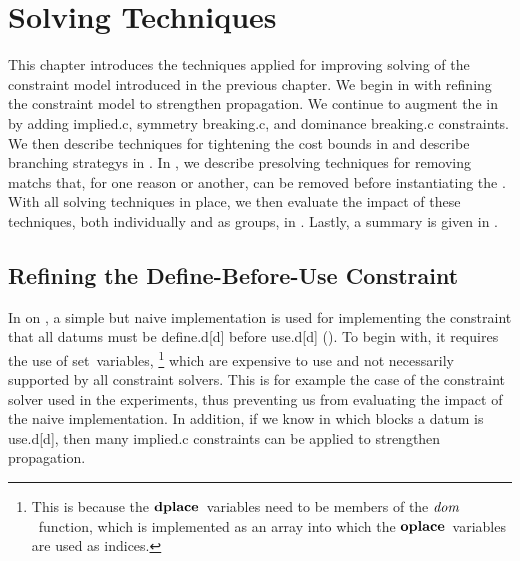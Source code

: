 %

\chapter{Solving Techniques}

This chapter introduces the techniques applied for improving solving of the
\gls{constraint model} introduced in the previous chapter.
%
We begin in  with refining the \gls{constraint model} to
strengthen \gls{propagation}.
%
We continue to augment the  in
 by adding
\gls{implied.c}, \gls{symmetry breaking.c}, and \gls{dominance breaking.c}
\glspl{constraint}.
%
We then describe techniques for tightening the cost bounds in
 and describe \glspl{branching strategy} in
.
%
In , we describe \gls{presolving} techniques for
removing \glspl{match} that, for one reason or another, can be removed before
instantiating the .
%
With all solving techniques in place, we then evaluate the impact of these
techniques, both individually and as groups, in
.
%
Lastly, a summary is given in .


\section{Refining the Define-Before-Use Constraint}

In  on , a simple
but naive implementation is used for implementing the \gls{constraint} that all
\glspl{datum} must be \gls{define.d}[d] before \gls{use.d}[d]
().
%
To begin with, it requires the use of set~\glspl{variable},\!%
%
\footnote{%
  This is because the $\mVar{dplace}$~\glspl{variable} need to be members of the
  $\operatorname{\textrm{\textit{dom}}}$~\gls{function}, which is implemented as an array into which the
  $\mVar{oplace}$~\glspl{variable} are used as indices.%
}
%
which are expensive to use and not necessarily supported by all
\glspl{constraint solver}.
%
This is for example the case of the \gls{constraint solver} used in the
experiments, thus preventing us from evaluating the impact of the naive
implementation.
%
In addition, if we know in which \glspl{block} a \gls{datum} is \gls{use.d}[d],
then many \gls{implied.c} \glspl{constraint} can be applied to strengthen
\gls{propagation}.

